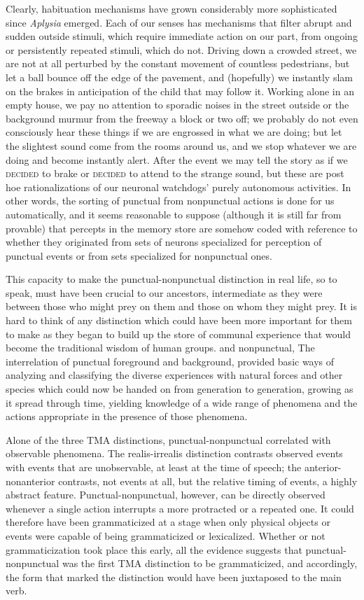 Clearly, habituation mechanisms have grown considerably more sophisticated since \textit{Aplysia} emerged. Each of our senses has mechanisms that filter abrupt and sudden outside stimuli, which require immediate action on our part, from ongoing or persistently repeated stimuli, which do not. Driving down a crowded street, we are not at all perturbed by the constant movement of countless pedestrians, but let a ball bounce off the edge of the pavement, and (hopefully) we instantly slam on the brakes in anticipation of the child that may follow it. Working alone in an empty house, we pay no attention to sporadic noises in the street outside or the background murmur from the freeway a block or two off; we probably do not even consciously hear these things if we are engrossed in what we are doing; but let the slightest sound come from the rooms around us, and we stop whatever we are doing and become instantly alert. After the event we may tell the story as if we \textsc{decided} to brake or \textsc{decided} to attend to the strange sound, but these are post hoe rationalizations of our neuronal watchdogs' purely autonomous activities. In other words, the sorting of punctual from nonpunctual actions is done for us automatically, and it seems reasonable to suppose (although it is still far from provable) that percepts in the memory store are somehow coded with reference to whether they originated from sets of neurons specialized for perception of punctual events or from sets specialized for nonpunctual ones.

This capacity to make the punctual-nonpunctual distinction in real life, so to speak, must have been crucial to our ancestors, intermediate as they were between those who might prey on them and those on whom they might prey. It is hard to think of any distinction which could have been more important for them to make as they began to build up the store of communal experience that would become
the traditional wisdom of human groups. and nonpunctual, The interrelation of punctual foreground and background, provided basic ways of analyzing and classifying the diverse experiences with natural forces and other species which could now be handed on from generation to generation, growing as it spread through time, yielding knowledge of a wide range of phenomena and the actions appropriate in the presence of those phenomena.

Alone of the three TMA distinctions, punctual-nonpunctual correlated with observable phenomena. The realis-irrealis distinction contrasts observed events with events that are unobservable, at least at the time of speech; the anterior-nonanterior contrasts, not events at all, but the relative timing of events, a highly abstract feature. Punctual-nonpunctual, however, can be directly observed whenever a single action interrupts a more protracted or a repeated one. It could therefore have been grammaticized at a stage when only physical objects or events were capable of being grammaticized or lexicalized. Whether or not grammaticization took place this early, all the evidence suggests that punctual-nonpunctual was the first TMA distinction to be grammaticized, and accordingly, the form that marked the distinction would have been juxtaposed to the main verb. 

